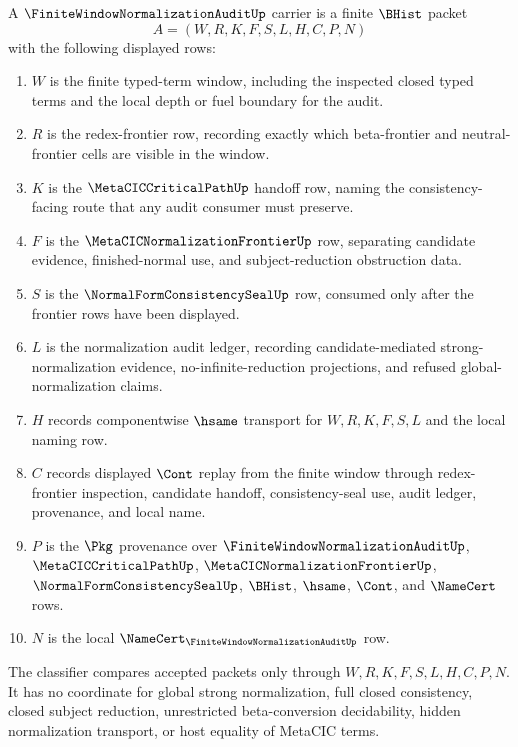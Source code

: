 \begin{definition}
\label{def:finite-window-normalization-audit-carrier}
A $\FiniteWindowNormalizationAuditUp$ carrier is a finite $\BHist$ packet
$$
A=(W,R,K,F,S,L,H,C,P,N)
$$
with the following displayed rows:
\begin{enumerate}
\item $W$ is the finite typed-term window, including the inspected closed typed terms and the local depth or fuel boundary for the audit.
\item $R$ is the redex-frontier row, recording exactly which beta-frontier and neutral-frontier cells are visible in the window.
\item $K$ is the $\MetaCICCriticalPathUp$ handoff row, naming the consistency-facing route that any audit consumer must preserve.
\item $F$ is the $\MetaCICNormalizationFrontierUp$ row, separating candidate evidence, finished-normal use, and subject-reduction obstruction data.
\item $S$ is the $\NormalFormConsistencySealUp$ row, consumed only after the frontier rows have been displayed.
\item $L$ is the normalization audit ledger, recording candidate-mediated strong-normalization evidence, no-infinite-reduction projections, and refused global-normalization claims.
\item $H$ records componentwise $\hsame$ transport for $W,R,K,F,S,L$ and the local naming row.
\item $C$ records displayed $\Cont$ replay from the finite window through redex-frontier inspection, candidate handoff, consistency-seal use, audit ledger, provenance, and local name.
\item $P$ is the $\Pkg$ provenance over $\FiniteWindowNormalizationAuditUp$, $\MetaCICCriticalPathUp$, $\MetaCICNormalizationFrontierUp$, $\NormalFormConsistencySealUp$, $\BHist$, $\hsame$, $\Cont$, and $\NameCert$ rows.
\item $N$ is the local $\NameCert_{\FiniteWindowNormalizationAuditUp}$ row.
\end{enumerate}
The classifier compares accepted packets only through $W,R,K,F,S,L,H,C,P,N$. It has no coordinate for global strong normalization, full closed consistency, closed subject reduction, unrestricted beta-conversion decidability, hidden normalization transport, or host equality of MetaCIC terms.
\end{definition}

